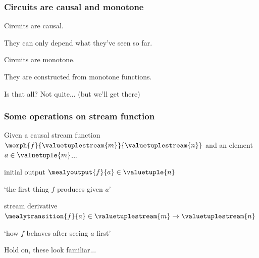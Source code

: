 \begin{frame}
    \frametitle{Circuits are causal and monotone}

    \Large
    Circuits are \alert{causal}.

    \wait

    \normalsize
    They can only depend \alert{what they've seen so far}.

    \wait

    \Large
    Circuits are \alert{monotone}.

    \wait

    \normalsize
    They are constructed from \alert{monotone functions}.

    \wait

    Is that all?
    \wait
    \alert{Not quite...}
    \wait
    (but we'll get there)


\end{frame}
\begin{frame}
    \frametitle{Some operations on stream function}

    Given a causal stream function \(
        \morph{f}{\valuetuplestream{m}}{\valuetuplestream{n}}
    \) and an element \(a \in \valuetuple{m}\)...

    \wait

    \Large \alert{initial output} \quad
    \(\mealyoutput{f}{a} \in \valuetuple{n}\)

    \wait

    `the first thing \(f\) produces given \(a\)'

    \wait

    \alert{stream derivative} \quad
    \(\mealytransition{f}{a} \in \valuetuplestream{m} \to \valuetuplestream{n}\)

    \wait

    `how \(f\) behaves after seeing \(a\) first'

    \wait
    Hold on, these look familiar...

\end{frame}
